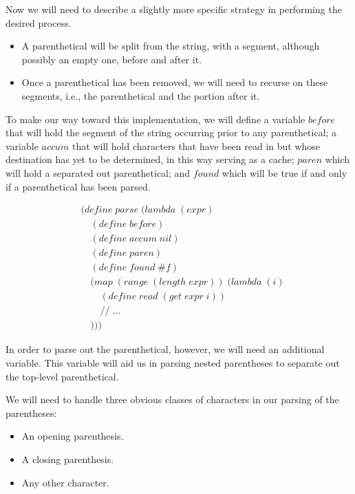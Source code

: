 Now we will need to describe a slightly more specific strategy in performing the desired 
process.

\begin{itemize}
  \item A parenthetical will be split from the string, with a segment, although possibly an empty one, before and after it.
  \item Once a parenthetical has been removed, we will need to recurse on these segments, i.e., the parenthetical and the portion after it.
\end{itemize}

To make our way toward this implementation, we will define a variable $before$ that will 
hold the segment of the string occurring prior to any parenthetical; a variable $accum$ 
that will hold characters that have been read in but whose destination has yet to be 
determined, in this way serving as a cache; $paren$ which will hold a separated out 
parenthetical; and $found$ which will be true if and only if a parenthetical has been 
parsed.

\begin{figure}[htp]
\caption{}\label{fig:definsPrelude}
\begin{align*}
& (define \; parse \; (lambda \; (expr) \; 
\\& \quad (define \; before)
\\& \quad (define \; accum \; nil)
\\& \quad (define \; paren)
\\& \quad (define \; found \; \#f)
\\& \quad (map \; (range \; (length \; expr)) \; (lambda \; (i)
\\& \qquad (define \; read \; (get \; expr \; i))
\\& \qquad // \; \dots
\\& \quad )))
\end{align*}
\end{figure}

In order to parse out the parenthetical, however, we will need an additional variable. 
This variable will aid us in parsing nested parentheses to separate out the top-level parenthetical.

We will need to handle three obvious classes of characters in our parsing of the parentheses:

\begin{itemize}
  \item An opening parenthesis.
  \item A closing parenthesis.
  \item Any other character.
\end{itemize}

